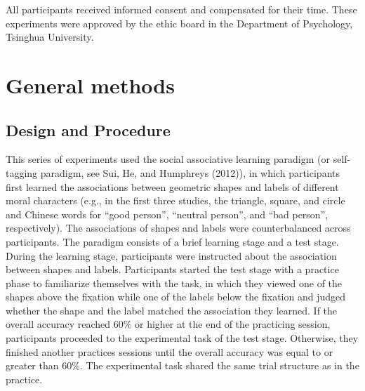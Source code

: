 \documentclass[
  man]{apa6}
\begin{document}
All participants received informed consent and compensated for their time. These experiments were approved by the ethic board in the Department of Psychology, Tsinghua University.

\hypertarget{general-methods}{%
\section{General methods}\label{general-methods}}

\hypertarget{design-and-procedure}{%
\subsection{Design and Procedure}\label{design-and-procedure}}

This series of experiments used the social associative learning paradigm (or self-tagging paradigm, see Sui, He, and Humphreys (2012)), in which participants first learned the associations between geometric shapes and labels of different moral characters (e.g., in the first three studies, the triangle, square, and circle and Chinese words for ``good person'', ``neutral person'', and ``bad person'', respectively). The associations of shapes and labels were counterbalanced across participants. The paradigm consists of a brief learning stage and a test stage. During the learning stage, participants were instructed about the association between shapes and labels. Participants started the test stage with a practice phase to familiarize themselves with the task, in which they viewed one of the shapes above the fixation while one of the labels below the fixation and judged whether the shape and the label matched the association they learned. If the overall accuracy reached 60\% or higher at the end of the practicing session, participants proceeded to the experimental task of the test stage. Otherwise, they finished another practices sessions until the overall accuracy was equal to or greater than 60\%. The experimental task shared the same trial structure as in the practice.
\end{document}
